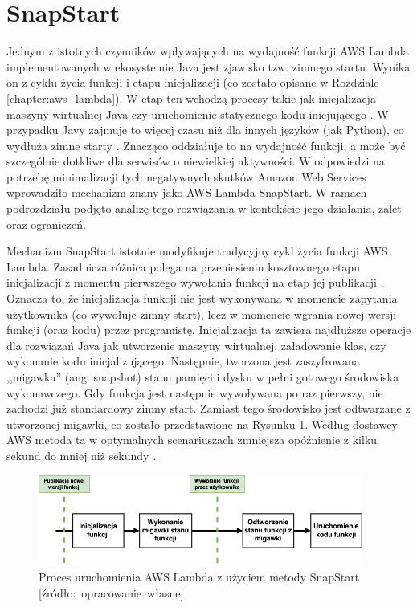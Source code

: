 \section{SnapStart}\label{chapter:snapstart}

Jednym z istotnych czynników wpływających na wydajność funkcji AWS Lambda implementowanych w ekosystemie Java jest zjawisko tzw. zimnego startu.
Wynika on z cyklu życia funkcji i etapu inicjalizacji (co zostało opisane w Rozdziale \ref{chapter:aws_lambda}).
W etap ten wchodzą procesy takie jak inicjalizacja maszyny wirtualnej Java czy uruchomienie statycznego kodu inicjującego \cite{awsLambdaDocs}.
W przypadku Javy zajmuje to więcej czasu niż dla innych języków (jak Python), co wydłuża zimne starty \cite{8605773}.
Znacząco oddziałuje to na wydajność funkcji, a może być szczególnie dotkliwe dla serwisów o niewielkiej aktywności.
W odpowiedzi na potrzebę minimalizacji tych negatywnych skutków Amazon Web Services wprowadziło mechanizm znany jako AWS Lambda SnapStart.
W ramach podrozdziału podjęto analizę tego rozwiązania w kontekście jego działania, zalet oraz ograniczeń. 

Mechanizm SnapStart istotnie modyfikuje tradycyjny cykl życia funkcji AWS Lambda.
Zasadnicza różnica polega na przeniesieniu kosztownego etapu inicjalizacji z momentu pierwszego wywołania funkcji na etap jej publikacji \cite{amazonSnapstartDeveloperGUide}.
Oznacza to, że inicjalizacja funkcji nie jest wykonywana w momencie zapytania użytkownika (co wywołuje zimny start), lecz w momencie wgrania nowej wersji funkcji (oraz kodu) przez programistę.
Inicjalizacja ta zawiera najdłuższe operacje dla rozwiązań Java jak utworzenie maszyny wirtualnej, załadowanie klas, czy wykonanie kodu inicjalizującego.
Następnie, tworzona jest zaszyfrowana ,,migawka'' (ang. snapshot) stanu pamięci i dysku w pełni gotowego środowiska wykonawczego.
Gdy funkcja jest następnie wywoływana po raz pierwszy, nie zachodzi już standardowy zimny start.
Zamiast tego środowisko jest odtwarzane z utworzonej migawki, co zostało przedstawione na Rysunku \ref{fig:aws_lambda_snapstart_process}.
Według dostawcy AWS metoda ta w optymalnych scenariuszach zmniejsza opóźnienie z kilku sekund do mniej niż sekundy \cite{amazonSnapstartDeveloperGUide}. 

\begin{figure}[h]
    \centering
    \includegraphics[width=0.95\textwidth]{charts/snapstart.png}
    \caption{Proces uruchomienia AWS Lambda z użyciem metody SnapStart [źródło:~opracowanie~własne]}
    \label{fig:aws_lambda_snapstart_process}
\end{figure}

